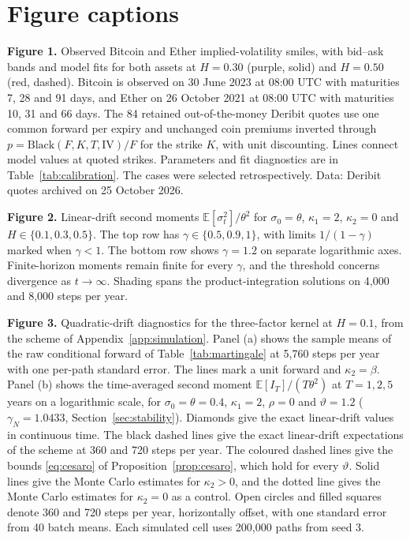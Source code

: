 \documentclass{rQUF2e}
\theoremstyle{plain}
\theoremstyle{definition}
\theoremstyle{remark}
\newcommand{\E}{\mathbb{E}}
\begin{document}
\section*{Figure captions}
\noindent\textbf{Figure 1.} Observed Bitcoin and Ether implied-volatility smiles, with bid--ask bands and model fits for both assets at $H=0.30$ (purple, solid) and $H=0.50$ (red, dashed). Bitcoin is observed on 30 June 2023 at 08:00 UTC with maturities 7, 28 and 91 days, and Ether on 26 October 2021 at 08:00 UTC with maturities 10, 31 and 66 days. The 84 retained out-of-the-money Deribit quotes use one common forward per expiry and unchanged coin premiums inverted through $p=\mathrm{Black}(F,K,T,\mathrm{IV})/F$ for the strike $K$, with unit discounting. Lines connect model values at quoted strikes. Parameters and fit diagnostics are in Table~\ref{tab:calibration}. The cases were selected retrospectively. Data: Deribit quotes archived on 25 October 2026.\par\medskip
\noindent\textbf{Figure 2.} Linear-drift second moments $\E[\sigma_t^2]/\theta^2$ for $\sigma_0=\theta$, $\kappa_1=2$, $\kappa_2=0$ and $H\in\{0.1,0.3,0.5\}$. The top row has $\gamma\in\{0.5,0.9,1\}$, with limits $1/(1-\gamma)$ marked when $\gamma<1$. The bottom row shows $\gamma=1.2$ on separate logarithmic axes. Finite-horizon moments remain finite for every $\gamma$, and the threshold concerns divergence as $t\to\infty$. Shading spans the product-integration solutions on 4,000 and 8,000 steps per year.\par\medskip
\noindent\textbf{Figure 3.} Quadratic-drift diagnostics for the three-factor kernel at $H=0.1$, from the scheme of Appendix~\ref{app:simulation}. Panel (a) shows the sample means of the raw conditional forward of Table~\ref{tab:martingale} at 5,760 steps per year with one per-path standard error. The lines mark a unit forward and $\kappa_2=\beta$. Panel (b) shows the time-averaged second moment $\E[I_T]/(T\theta^2)$ at $T=1,2,5$ years on a logarithmic scale, for $\sigma_0=\theta=0.4$, $\kappa_1=2$, $\rho=0$ and $\vartheta=1.2$ ($\gamma_N=1.0433$, Section~\ref{sec:stability}). Diamonds give the exact linear-drift values in continuous time. The black dashed lines give the exact linear-drift expectations of the scheme at 360 and 720 steps per year. The coloured dashed lines give the bounds \eqref{eq:cesaro} of Proposition~\ref{prop:cesaro}, which hold for every $\vartheta$. Solid lines give the Monte Carlo estimates for $\kappa_2>0$, and the dotted line gives the Monte Carlo estimates for $\kappa_2=0$ as a control. Open circles and filled squares denote 360 and 720 steps per year, horizontally offset, with one standard error from 40 batch means. Each simulated cell uses 200{,}000 paths from seed 3.\par\medskip
\end{document}
